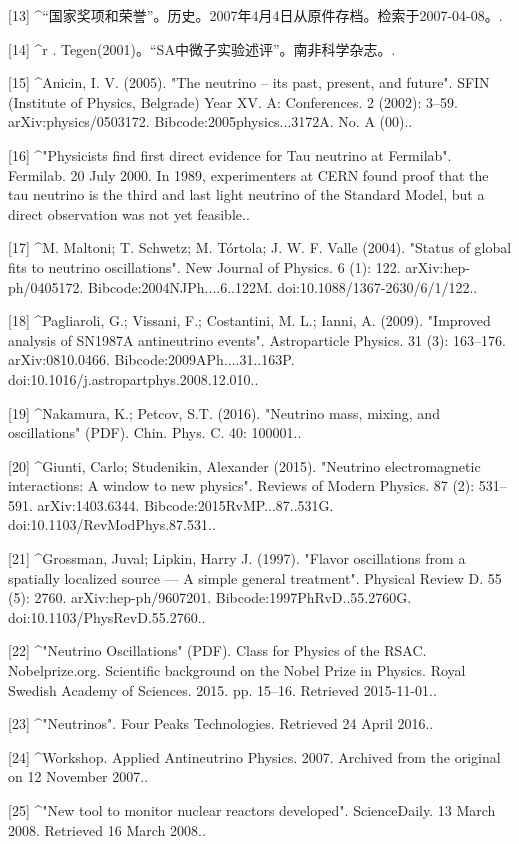 [13]
^“国家奖项和荣誉”。历史。2007年4月4日从原件存档。检索于2007-04-08。.

[14]
^r . Tegen(2001)。“SA中微子实验述评”。南非科学杂志。.

[15]
^Anicin, I. V. (2005). "The neutrino – its past, present, and future". SFIN (Institute of Physics, Belgrade) Year XV. A: Conferences. 2 (2002): 3–59. arXiv:physics/0503172. Bibcode:2005physics...3172A. No. A (00)..

[16]
^"Physicists find first direct evidence for Tau neutrino at Fermilab". Fermilab. 20 July 2000. In 1989, experimenters at CERN found proof that the tau neutrino is the third and last light neutrino of the Standard Model, but a direct observation was not yet feasible..

[17]
^M. Maltoni; T. Schwetz; M. Tórtola; J. W. F. Valle (2004). "Status of global fits to neutrino oscillations". New Journal of Physics. 6 (1): 122. arXiv:hep-ph/0405172. Bibcode:2004NJPh....6..122M. doi:10.1088/1367-2630/6/1/122..

[18]
^Pagliaroli, G.; Vissani, F.; Costantini, M. L.; Ianni, A. (2009). "Improved analysis of SN1987A antineutrino events". Astroparticle Physics. 31 (3): 163–176. arXiv:0810.0466. Bibcode:2009APh....31..163P. doi:10.1016/j.astropartphys.2008.12.010..

[19]
^Nakamura, K.; Petcov, S.T. (2016). "Neutrino mass, mixing, and oscillations" (PDF). Chin. Phys. C. 40: 100001..

[20]
^Giunti, Carlo; Studenikin, Alexander (2015). "Neutrino electromagnetic interactions: A window to new physics". Reviews of Modern Physics. 87 (2): 531–591. arXiv:1403.6344. Bibcode:2015RvMP...87..531G. doi:10.1103/RevModPhys.87.531..

[21]
^Grossman, Juval; Lipkin, Harry J. (1997). "Flavor oscillations from a spatially localized source — A simple general treatment". Physical Review D. 55 (5): 2760. arXiv:hep-ph/9607201. Bibcode:1997PhRvD..55.2760G. doi:10.1103/PhysRevD.55.2760..

[22]
^"Neutrino Oscillations" (PDF). Class for Physics of the RSAC. Nobelprize.org. Scientific background on the Nobel Prize in Physics. Royal Swedish Academy of Sciences. 2015. pp. 15–16. Retrieved 2015-11-01..

[23]
^"Neutrinos". Four Peaks Technologies. Retrieved 24 April 2016..

[24]
^Workshop. Applied Antineutrino Physics. 2007. Archived from the original on 12 November 2007..

[25]
^"New tool to monitor nuclear reactors developed". ScienceDaily. 13 March 2008. Retrieved 16 March 2008..

